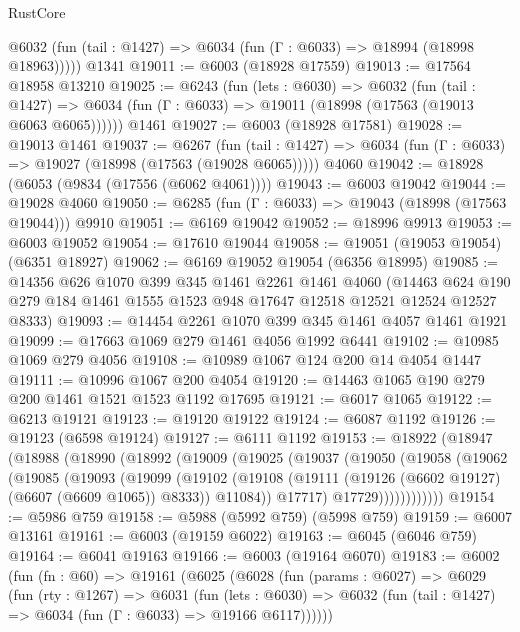\begin{lexlean}{RustCore}
\begin{coremodule}
      @6032 (fun (tail : @1427) => @6034 (fun (Γ : @6033) => @18994 (@18998 @18963)))))
    @1341
@19011 := @6003 (@18928 @17559)
@19013 := @17564 @18958 @13210
@19025 := @6243
    (fun (lets : @6030) =>
    @6032
      (fun (tail : @1427) =>
      @6034 (fun (Γ : @6033) => @19011 (@18998 (@17563 (@19013 @6063 @6065))))))
    @1461
@19027 := @6003 (@18928 @17581)
@19028 := @19013 @1461
@19037 := @6267
    (fun (tail : @1427) => @6034 (fun (Γ : @6033) => @19027 (@18998 (@17563 (@19028 @6065)))))
    @4060
@19042 := @18928 (@6053 (@9834 (@17556 (@6062 @4061))))
@19043 := @6003 @19042
@19044 := @19028 @4060
@19050 := @6285 (fun (Γ : @6033) => @19043 (@18998 (@17563 @19044))) @9910
@19051 := @6169 @19042
@19052 := @18996 @9913
@19053 := @6003 @19052
@19054 := @17610 @19044
@19058 := @19051 (@19053 @19054) (@6351 @18927)
@19062 := @6169 @19052 @19054 (@6356 @18995)
@19085 := @14356
    @626
    @1070
    @399
    @345
    @1461
    @2261
    @1461
    @4060
    (@14463 @624 @190 @279 @184 @1461 @1555 @1523 @948 @17647 @12518 @12521 @12524 @12527 @8333)
@19093 := @14454 @2261 @1070 @399 @345 @1461 @4057 @1461 @1921
@19099 := @17663 @1069 @279 @1461 @4056 @1992 @6441
@19102 := @10985 @1069 @279 @4056
@19108 := @10989 @1067 @124 @200 @14 @4054 @1447
@19111 := @10996 @1067 @200 @4054
@19120 := @14463 @1065 @190 @279 @200 @1461 @1521 @1523 @1192 @17695
@19121 := @6017 @1065
@19122 := @6213 @19121
@19123 := @19120 @19122
@19124 := @6087 @1192
@19126 := @19123 (@6598 @19124)
@19127 := @6111 @1192
@19153 := @18922
    (@18947
      (@18988
        (@18990
          (@18992
            (@19009
              (@19025
                (@19037
                  (@19050
                    (@19058
                      (@19062
                        (@19085
                          (@19093
                            (@19099
                              (@19102
                                (@19108
                                  (@19111 (@19126 (@6602 @19127) (@6607 (@6609 @1065)) @8333))
                                  @11084))
                              @17717)
                            @17729))))))))))))
@19154 := @5986 @759
@19158 := @5988 (@5992 @759) (@5998 @759)
@19159 := @6007 @13161
@19161 := @6003 (@19159 @6022)
@19163 := @6045 (@6046 @759)
@19164 := @6041 @19163
@19166 := @6003 (@19164 @6070)
@19183 := @6002
    (fun (fn : @60) =>
    @19161
      (@6025
        (@6028
          (fun (params : @6027) =>
          @6029
            (fun (rty : @1267) =>
            @6031
              (fun (lets : @6030) =>
              @6032 (fun (tail : @1427) => @6034 (fun (Γ : @6033) => @19166 @6117))))))

\end{coremodule}
\end{lexlean}
